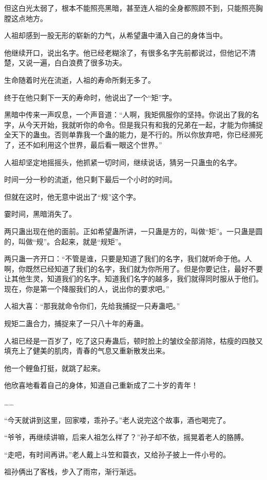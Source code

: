 \begin{this_body}
但这白光太弱了，根本不能照亮黑暗，甚至连人祖的全身都照顾不到，只能照亮胸膛这点地方。

人祖却感到一股无形的崭新的力气，从希望蛊中涌入自己的身体当中。

他继续开口，说出名字。他已经老糊涂了，有很多名字先前都说过，但他记不清楚，又说一遍，白白浪费了很多功夫。

生命随着时光在流逝，人祖的寿命所剩无多了。

终于在他只剩下一天的寿命时，他说出了一个“矩”字。

黑暗中传来一声叹息，一个声音道：“人啊，我矩佩服你的坚持。你说出了我的名字，从今天开始，我就听你的命令。但是我只有和我的兄弟在一起，才能为你捕捉全天下的蛊虫。否则单靠我一个蛊的能力，是不行的。所以你放弃吧，你已经濒死了，还不如利用这个世界，最后看一眼这个世界。”

人祖却坚定地摇摇头，他抓紧一切时间，继续说话，猜另一只蛊虫的名字。

时间一分一秒的流逝，他只剩下最后一个小时的时间。

但就在这时，他无意中说出了“规”这个字。

霎时间，黑暗消失了。

两只蛊出现在他的面前。正如希望蛊所讲，一只蛊是方的，叫做“矩”。一只蛊是圆的，叫做“规”。合起来，就是“规矩”。

两只蛊一齐开口：“不管是谁，只要是知道了我们的名字，我们就听命于他。人啊，你既然已经知道了我们的名字，我们就为你所用了。但是你要记住，最好不要让其他生灵，知道我们的名字。知道我们名字的越多，我们就得同时服从于他们。现在，你是第一个降服我们的人，说出你的要求吧。”

人祖大喜：“那我就命令你们，先给我捕捉一只寿蛊吧。”

规矩二蛊合力，捕捉来了一只八十年的寿蛊。

人祖已经是一百岁了，吃了这只寿蛊后，顿时脸上的皱纹全部消除，枯瘦的四肢又填充上了健美的肌肉，青春的气息又重新散发出来。

他一个鲤鱼打挺，就跳了起来。

他欣喜地看着自己的身体，知道自己重新成了二十岁的青年！

……

“今天就讲到这里，回家喽，乖孙子。”老人说完这个故事，酒也喝完了。

“爷爷，再继续讲嘛，后来人祖怎么样了？”孙子却不依，摇晃着老人的胳膊。

“走吧，有时间再讲。”老人戴上斗笠和蓑衣，又给孙子披上一件小号的。

祖孙俩出了客栈，步入了雨帘，渐行渐远。


\end{this_body}
